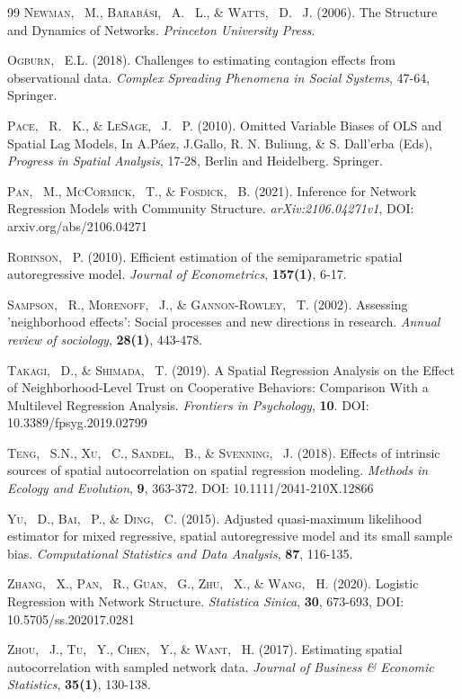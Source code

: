 \documentclass[times, doublespace]{auth}
\begin{document}
\begin{thebibliography}{99}
\textsc{Newman, ~M., Barabási, ~A. ~L., \& Watts, ~D. ~J.} (2006). The Structure and Dynamics of Networks. \textit{Princeton University Press}.

\textsc{Ogburn, ~E.L.} (2018). Challenges to estimating contagion effects from observational data. \textit{Complex Spreading Phenomena in Social Systems}, 47-64, Springer.

\textsc{Pace, ~R. ~K., \& LeSage, ~J. ~P.} (2010). Omitted Variable Biases of OLS and Spatial Lag Models, In A.Páez, J.Gallo, R. N. Buliung, \& S. Dall'erba (Eds), \textit{Progress in Spatial Analysis}, 17-28, Berlin and Heidelberg. Springer.

\textsc{Pan, ~M., McCormick, ~T., \& Fosdick, ~B.} (2021). Inference for Network Regression Models with Community Structure. \textit{arXiv:2106.04271v1}, DOI: arxiv.org/abs/2106.04271

\textsc{Robinson, ~P.} (2010). Efficient estimation of the semiparametric spatial autoregressive model. \textit{Journal of Econometrics}, \textbf{157(1)}, 6-17.

\textsc{Sampson, ~R., Morenoff, ~J., \& Gannon-Rowley, ~T.} (2002). Assessing 'neighborhood effects': Social processes and new directions in research. \textit{Annual review of sociology}, \textbf{28(1)}, 443-478.

\textsc{Takagi, ~D., \& Shimada, ~T.} (2019). A Spatial Regression Analysis on the Effect of Neighborhood-Level Trust on Cooperative Behaviors: Comparison With a Multilevel Regression Analysis. \textit{Frontiers in Psychology}, \textbf{10}. DOI: 10.3389/fpsyg.2019.02799

\textsc{Teng, ~S.N., Xu, ~C., Sandel, ~B., \& Svenning, ~J.} (2018). Effects of intrinsic sources of spatial autocorrelation on spatial regression modeling. \textit{Methods in Ecology and Evolution}, \textbf{9}, 363-372. DOI: 10.1111/2041-210X.12866

\textsc{Yu, ~D., Bai, ~P., \& Ding, ~C.} (2015). Adjusted quasi-maximum likelihood estimator for mixed regressive, spatial autoregressive model and its small sample bias. \textit{Computational Statistics and Data Analysis}, \textbf{87}, 116-135.

\textsc{Zhang, ~X., Pan, ~R., Guan, ~G., Zhu, ~X., \& Wang, ~H.} (2020). Logistic Regression with Network Structure. \textit{Statistica Sinica}, \textbf{30}, 673-693, DOI: 10.5705/ss.202017.0281

\textsc{Zhou, ~J., Tu, ~Y., Chen, ~Y., \& Want, ~H.} (2017). Estimating spatial autocorrelation with sampled network data. \textit{Journal of Business \& Economic Statistics}, \textbf{35(1)}, 130-138.

\end{thebibliography}
\end{document}
